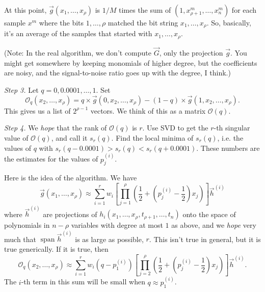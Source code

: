 \documentclass{amsart}
\begin{document}
At this point, $\vec g(x_1, \ldots, x_\rho)$ is $1/M$ times the sum of $(1, x^m_{\rho + 1}, \ldots, x^m_n)$ for each sample $x^m$ where the bits $1, \ldots, \rho$ matched the bit string $x_1, \ldots, x_\rho$. So, basically, it's an average of the samples that started with $x_1, \ldots, x_\rho$.

(Note: In the real algorithm, we don't compute $\vec G$, only the projection $\vec g$. You might get somewhere by keeping monomials of higher degree, but the coefficients are noisy, and the signal-to-noise ratio goes up with the degree, I think.)

\emph{Step 3.}
Let $q = 0, 0.0001, \ldots, 1$. Set
$$\mathcal{O}_q(x_2, \ldots, x_\rho) = q \times \vec g(0, x_2, \ldots, x_\rho) - (1-q) \times\vec g(1, x_2, \ldots, x_\rho).$$
This gives us a list of $2^{\rho - 1}$ vectors. We think of this as a matrix $\mathcal{O}(q)$.



\emph{Step 4.}
We \emph{hope} that the rank of $\mathcal O(q)$ is $r$. Use SVD to get the $r$-th singular value of $\mathcal O(q)$, and call it $s_r(q)$.
Find the local minima of $s_r(q)$, i.e. the values of $q$ with $s_r(q - 0.0001) > s_r(q) < s_r(q + 0.0001)$. These numbers are the estimates for the values of $p^{(i)}_j$.

\vspace{1em}



Here is the idea of the algorithm. We have
$$\vec g(x_1, \ldots, x_\rho) \approx \sum_{i=1}^r w_i \left[\prod_{j=1}^\rho\left(\frac12 + \left(p^{(i)}_j - \frac12\right)x_j \right)\right] \vec h^{(i)}$$
where $\vec h^{(i)}$ are projections of $h_i(x_1, \ldots, x_\rho, t_{\rho + 1}, \ldots, t_n)$ onto the space of polynomials in $n-\rho$ variables with degree at most $1$ as above, and we \emph{hope} very much that $\mathop{\text{span}} \vec h^{(i)}$ is as large as possible, $r$. This isn't true in general, but it is true generically.
If it is true, then
$$\mathcal{O}_q(x_2, \ldots, x_\rho) \approx \sum_{i=1}^r w_i (q - p^{(i)}_1) \left[\prod_{j=2}^\rho \left(\frac12 + \left(p^{(i)}_j - \frac12\right)x_j\right)\right] \vec h^{(i)}.$$
The $i$-th term in this sum will be small when $q \approx p^{(i)}_1$.
\end{document}
